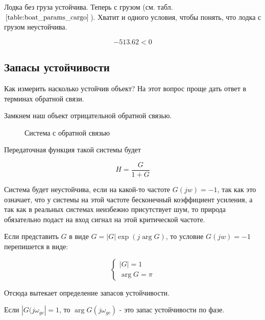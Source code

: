 \documentclass[12pt,a4paper]{article}
\begin{document}
Лодка без груза устойчива. Теперь с грузом (см. табл. $\ref{table:boat_params_cargo}$). Хватит и одного условия, чтобы понять, что лодка с грузом неустойчива.

$$ -513.62 < 0 $$

\cite{polyak_scherbakov_robust}

\subsection{Запасы устойчивости} 

Как измерить насколько устойчив объект? На этот вопрос проще дать ответ в терминах обратной связи.

Замкнем наш объект отрицательной обратной связью.

\begin{figure}
	\caption{Система с обратной связью}
\end{figure}

Передаточная функция такой системы будет

$$ H = \frac{G}{1+G} $$

Система будет неустойчива, если на какой-то частоте $G(jw) = -1$, так как это означает, что у системы на этой частоте бесконечный коэффициент усиления, а так как в реальных системах неизбежно присутствует шум, то природа обязательно подаст на вход сигнал на этой критической частоте. 

Если представить $G$ в виде $G = |G|\exp(j\arg G)$, то условие $G(jw) = -1$ перепишется в виде:

\begin{equation*}
	\begin{cases}
		|G| = 1 \\
		\arg G = \pi
	\end{cases}
\end{equation*}

Отсюда вытекает определение запасов устойчивости.

Если $|G(j\omega_{gc}| = 1$, то $\arg G(j\omega_{gc})$ - это запас устойчивости по фазе.
\end{document}
